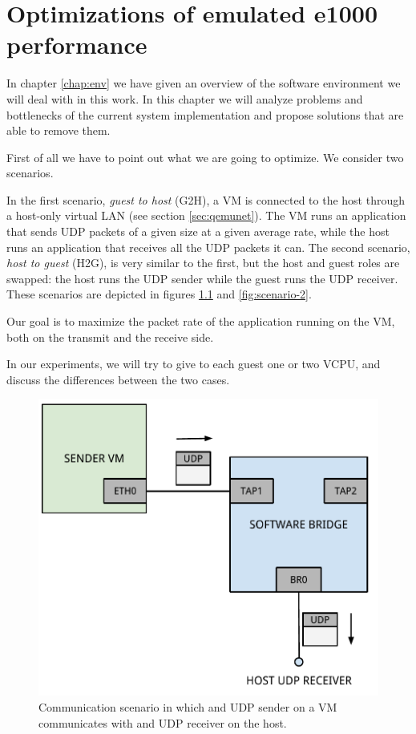 \chapter{Optimizations of emulated e1000 performance}
\label{cha:e1000-opt}
In chapter \ref{chap:env} we have given an overview of the software environment we will deal with in this work.
In this chapter we will analyze problems and bottlenecks of the current system implementation and propose solutions that are able
to remove them.

\vspace{0.5cm}

First of all we have to point out what we are going to optimize. We consider two scenarios.

In the first scenario, \emph{guest to host} (G2H), a VM is connected to the host through a host-only virtual LAN (see 
section \ref{sec:qemunet}). The VM runs an application that sends UDP packets of a given size at a given average rate, while 
the host runs an application that receives all the UDP packets it can.
The second scenario, \emph{host to guest} (H2G), is very similar to the first, but the host and guest roles are swapped: the host runs 
the UDP sender while the guest runs the UDP receiver. These scenarios are depicted in figures \ref{fig:scenario-1} and \ref{fig:scenario-2}.

Our goal is to maximize the packet rate of the application running on the VM, both on the transmit and the receive side.

\vspace{0.5cm}

In our experiments, we will try to give to each guest one or two VCPU, and discuss the differences between the two cases.

\begin{figure}[bt]
\centering
\includegraphics[scale = 0.60]{scenario-1.pdf}
\caption{Communication scenario in which and UDP sender on a VM communicates with and UDP receiver on the host.}
\label{fig:scenario-1}
\end{figure}

